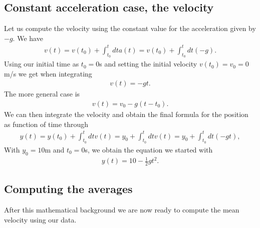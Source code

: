 \documentclass[letterpaper,10pt,english]{sphinxmanual}
\begin{document}
\subsection{Constant acceleration case, the velocity}
\label{\detokenize{chapter2:constant-acceleration-case-the-velocity}}
Let us compute the velocity using the constant value for the acceleration given by \(-g\). We have
\begin{equation*}
\begin{split}
v(t)=v(t_0)+\int_{t_0}^t dt a(t)=v(t_0)+\int_{t_0}^t dt (-g).
\end{split}
\end{equation*}
Using our initial time as \(t_0=0\)s and setting the initial velocity \(v(t_0)=v_0=0\)m/s we get when integrating
\begin{equation*}
\begin{split}
v(t)=-gt.
\end{split}
\end{equation*}
The more general case is
\begin{equation*}
\begin{split}
v(t)=v_0-g(t-t_0).
\end{split}
\end{equation*}
We can then integrate the velocity and obtain the final formula for the position as function of time through
\begin{equation*}
\begin{split}
y(t)=y(t_0)+\int_{t_0}^t dt v(t)=y_0+\int_{t_0}^t dt v(t)=y_0+\int_{t_0}^t dt (-gt),
\end{split}
\end{equation*}
With \(y_0=10\)m and \(t_0=0\)s, we obtain the equation we started with
\begin{equation*}
\begin{split}
y(t)=10-\frac{1}{2}gt^2.
\end{split}
\end{equation*}

\subsection{Computing the averages}
\label{\detokenize{chapter2:computing-the-averages}}
After this mathematical background we are now ready to compute the mean velocity using our data.
\end{document}
